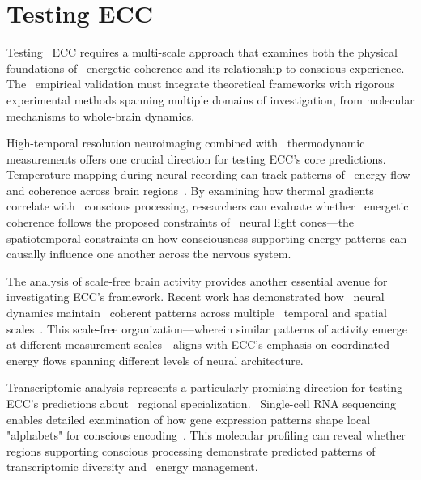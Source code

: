 \section{Testing ECC}

Testing~ ECC requires a multi-scale approach that examines both the physical foundations of~ energetic coherence and its relationship to conscious experience. The~ empirical validation must integrate theoretical frameworks with rigorous experimental methods spanning multiple domains of investigation, from molecular mechanisms to whole-brain dynamics.

High-temporal resolution neuroimaging combined with~ thermodynamic measurements offers one crucial direction for testing ECC's core predictions. Temperature mapping during neural recording can track patterns of~ energy flow and coherence across brain regions~\cite{Watts2018}. By examining how thermal gradients correlate with~ conscious processing, researchers can evaluate whether~ energetic coherence follows the proposed constraints of~ neural light cones—the spatiotemporal constraints on how consciousness-supporting energy patterns can causally influence one another across the nervous system.

The analysis of scale-free brain activity provides another essential avenue for investigating ECC's framework. Recent work has demonstrated how~ neural dynamics maintain~ coherent patterns across multiple~ temporal and spatial scales~\cite{He2014, breakspear2005dynamics}. This scale-free organization—wherein similar patterns of activity emerge at different measurement scales—aligns with ECC's emphasis on coordinated~ energy flows spanning different levels of neural architecture.

 Transcriptomic analysis represents a particularly promising direction for testing ECC's predictions about~ regional specialization.~ Single-cell RNA sequencing enables detailed examination of how gene expression patterns shape local "alphabets" for conscious encoding~\cite{Gallegos2020}. This molecular profiling can reveal whether regions supporting conscious processing demonstrate predicted patterns of~ transcriptomic diversity and~ energy management.

